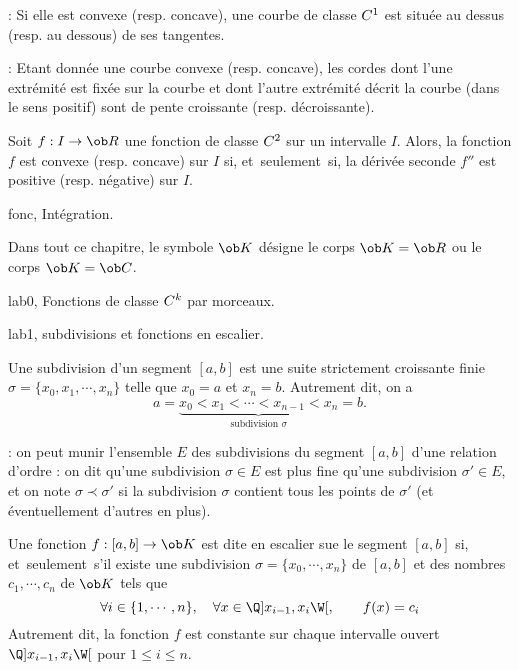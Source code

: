 \Remarque : Si elle est convexe (resp. concave), une courbe de classe $\sc C^1$ est situ\'ee au dessus (resp. au dessous) de ses tangentes. 
\bigskip

\Remarque  : Etant donn\'ee une courbe convexe (resp. concave), les cordes dont l'une extr\'emit\'e est fix\'ee sur la courbe et dont l'autre extr\'emit\'e d\'ecrit la courbe (dans le sens positif) sont 
de pente croissante (resp. d\'ecroissante). 
\bigskip

\Propriete []  Soit $f:I\to\ob R$ une fonction de classe $\sc C^2$ sur un intervalle $I$. Alors, la fonction $f$ est convexe (resp. concave) sur $I$ si, et~seulement~si, la d\'eriv\'ee seconde $f''$ est positive (resp. n\'egative) sur $I$. 
\bigskip

















\pagetitretrue


\Chapter fonc, Int\'egration. 
\bigskip

\noindent
Dans tout ce chapitre, le symbole $\ob K$ d\'esigne le corps $\ob K=\ob R$ ou le corps $\ob K=\ob C$. 
\bigskip

\Section lab0, Fonctions de classe $\sc C^k$ par morceaux. 

\Subsection lab1, subdivisions et fonctions en escalier. 

\Definition []  Une subdivision d'un segment $[a,b]$ est une suite strictement croissante finie $\sigma=\{x_0,x_1,\cdots, x_n\}$ telle que $x_0=a$ et $x_n=b$. Autrement dit, on a
$$
a=\underbrace{x_0<x_1<\cdots <x_{n-1} < x_n}_{\mbox{subdivision $\sigma$}}=b. 
$$ 

\Remarque : on peut munir l'ensemble $E$ des subdivisions du segment $[a,b]$ d'une relation d'ordre : on dit qu'une subdivision $\sigma\in E$ est plus fine qu'une subdivision $\sigma'\in E$, et on note $\sigma\prec\sigma'$ si la subdivision $\sigma$ contient tous les points de $\sigma'$ (et \'eventuellement d'autres en plus). 
\bigskip

\Definition []  Une fonction $f:[a,b]\to\ob K$ est dite en escalier sue le segment $[a,b]$ si, et~seulement~s'il existe une subdivision $\sigma=\{x_0,\cdots,x_n\}$ de $[a,b]$ et des nombres $c_1,\cdots,c_n$ de $\ob K$ tels que 
$$
\forall i\in\{1,\cdots, n\}, \quad \forall x\in\Q]x_{i-1},x_i\W[,\qquad f(x)=c_i
$$ 
Autrement dit, la fonction $f$ est constante sur chaque intervalle ouvert $\Q]x_{i-1},x_i\W[$ pour $1\le i\le n$. 
\bigskip

